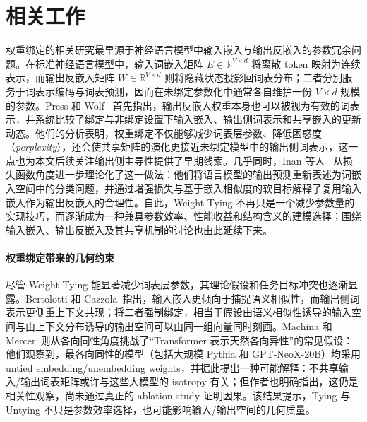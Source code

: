 \documentclass{article}
\theoremstyle{plain}
\theoremstyle{definition}
\theoremstyle{remark}
\begin{document}
\section{相关工作}

权重绑定的相关研究最早源于神经语言模型中输入嵌入与输出反嵌入的参数冗余问题。在标准神经语言模型中，输入词嵌入矩阵 $E\in\mathbb{R}^{V\times d}$ 将离散 token 映射为连续表示，而输出反嵌入矩阵 $W\in\mathbb{R}^{V\times d}$ 则将隐藏状态投影回词表分布；二者分别服务于词表示编码与词表预测，因而在未绑定参数化中通常各自维护一份 $V\times d$ 规模的参数。Press 和 Wolf~\cite{press2017using} 首先指出，输出反嵌入权重本身也可以被视为有效的词表示，并系统比较了绑定与非绑定设置下输入嵌入、输出侧词表示和共享嵌入的更新动态。他们的分析表明，权重绑定不仅能够减少词表层参数、降低困惑度（\textit{perplexity}），还会使共享矩阵的演化更接近未绑定模型中的输出侧词表示，这一点也为本文后续关注输出侧主导性提供了早期线索。几乎同时，Inan 等人~\cite{inan2017tying} 从损失函数角度进一步理论化了这一做法：他们将语言模型的输出预测重新表述为词嵌入空间中的分类问题，并通过增强损失与基于嵌入相似度的软目标解释了复用输入嵌入作为输出反嵌入的合理性。自此，Weight Tying 不再只是一个减少参数量的实现技巧，而逐渐成为一种兼具参数效率、性能收益和结构含义的建模选择；围绕输入嵌入、输出反嵌入及其共享机制的讨论也由此延续下来。

\paragraph{权重绑定带来的几何约束}
尽管 Weight Tying 能显著减少词表层参数，其理论假设和任务目标冲突也逐渐显露。Bertolotti 和 Cazzola~\cite{bertolotti2024dh}指出，输入嵌入更倾向于捕捉语义相似性，而输出侧词表示更侧重上下文共现；将二者强制绑定，相当于假设由语义相似性诱导的输入空间与由上下文分布诱导的输出空间可以由同一组向量同时刻画。Machina 和 Mercer~\cite{machina2024anisotropy}则从各向同性角度挑战了“Transformer 表示天然各向异性”的常见假设：他们观察到，最各向同性的模型（包括大规模 Pythia 和 GPT-NeoX-20B）均采用 untied embedding/unembedding weights，并据此提出一种可能解释：不共享输入/输出词表矩阵或许与这些大模型的 isotropy 有关；但作者也明确指出，这仍是相关性观察，尚未通过真正的 ablation study 证明因果。该结果提示，Tying 与 Untying 不只是参数效率选择，也可能影响输入/输出空间的几何质量。
\end{document}
